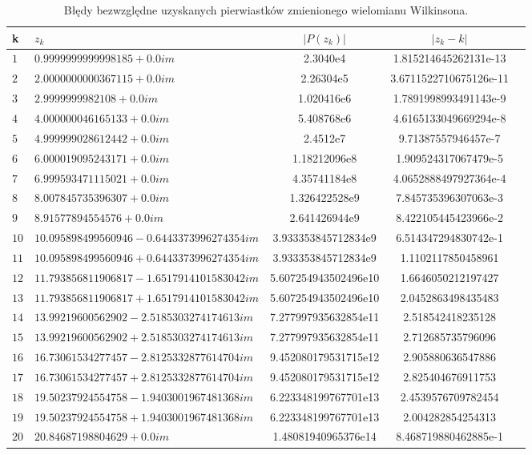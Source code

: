 \documentclass{classrep}
\begin{document}
		\begin{table}[!h]
        	\centering
        	\footnotesize
					
			\begin{tabular}{l|l|S|S|S} \toprule
				{k} & {$z_k$} & {$|P(z_k)|$} & {$|z_k-k|$} \\ \midrule
				$1$ & $0.9999999999998185 + 0.0im$ & 2.3040e4 & 1.815214645262131e-13 \\ 
	 			$2$ & $2.0000000000367115 + 0.0im$ & 2.26304e5 & 3.6711522710675126e-11 \\
	 			$3$ & $2.9999999982108 + 0.0im$ & 1.020416e6 & 1.7891998993491143e-9 \\
	 			$4$ & $4.000000046165133 + 0.0im$ & 5.408768e6 & 4.6165133049669294e-8 \\
	 			$5$ & $4.999999028612442 + 0.0im$ & 2.4512e7 & 9.71387557946457e-7 \\ 
	 			$6$ & $6.000019095243171 + 0.0im$ & 1.18212096e8 & 1.909524317067479e-5 \\
	 			$7$ & $6.999593471115021 + 0.0im$ & 4.35741184e8 & 4.0652888497927364e-4 \\
	 			$8$ & $8.007845735396307 + 0.0im$ & 1.326422528e9 & 7.845735396307063e-3 \\ 
	 			$9$ & $8.91577894554576 + 0.0im$ & 2.641426944e9 & 8.422105445423966e-2 \\
	 			$10$ & $10.095898499560946 - 0.6443373996274354im$ & 3.933353845712834e9 & 6.514347294830742e-1 \\
	 			$11$ & $10.095898499560946 + 0.6443373996274354im$ & 3.933353845712834e9 & 1.1102117850458961 \\ 
	 			$12$ & $11.793856811906817 - 1.6517914101583042im$ & 5.607254943502496e10 & 1.6646050212197427 \\
	 			$13$ & $11.793856811906817 + 1.6517914101583042im$ & 5.607254943502496e10 & 2.0452863498435483 \\ 	 			
	 			$14$ & $13.99219600562902 - 2.5185303274174613im$ & 7.277997935632854e11 & 2.518542418235128 \\	 			
	 			$15$ & $13.99219600562902 + 2.5185303274174613im$ & 7.277997935632854e11 & 2.712685735796096 \\
	 			$16$ & $16.73061534277457 - 2.8125332877614704im$ & 9.452080179531715e12 & 2.905880636547886 \\ 
	 			$17$ & $16.73061534277457 + 2.8125332877614704im$ & 9.452080179531715e12 & 2.825404676911753 \\
	 			$18$ & $19.50237924554758 - 1.9403001967481368im$ & 6.223348199767701e13 & 2.4539576709782454 \\ 
	 			$19$ & $19.50237924554758 + 1.9403001967481368im$ & 6.223348199767701e13 & 2.004282854254313 \\
	 			$20$ & $20.84687198804629 + 0.0im$ & 1.48081940965376e14 & 8.468719880462885e-1 \\ \bottomrule
	 			
	 		\end{tabular}
	 		\caption{Błędy bezwzględne uzyskanych pierwiastków zmienionego wielomianu Wilkinsona.}
			\label{table:5}
		\end{table}	
\end{document}
